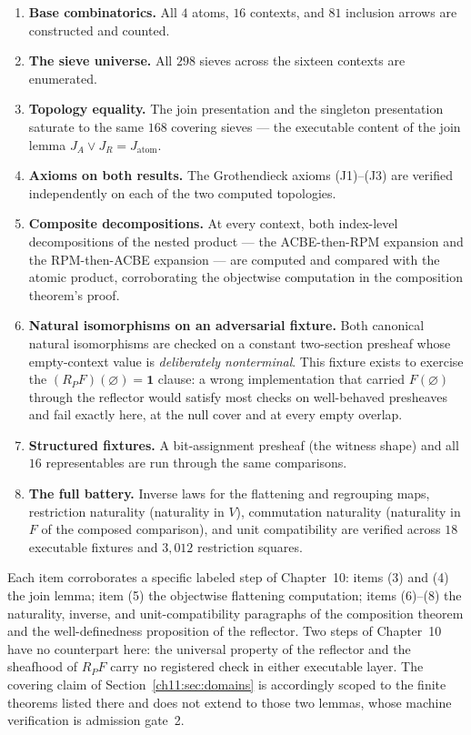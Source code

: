 \begin{enumerate}
\item \textbf{Base combinatorics.} All $4$ atoms, $16$ contexts, and $81$
inclusion arrows are constructed and counted.
\item \textbf{The sieve universe.} All $298$ sieves across the sixteen
contexts are enumerated.
\item \textbf{Topology equality.} The join presentation and the singleton
presentation saturate to the same $168$ covering sieves --- the executable
content of the join lemma $J_A \vee J_R = J_{\mathrm{atom}}$.
\item \textbf{Axioms on both results.} The Grothendieck axioms (J1)--(J3)
are verified independently on each of the two computed topologies.
\item \textbf{Composite decompositions.} At every context, both index-level
decompositions of the nested product --- the ACBE-then-RPM expansion and the
RPM-then-ACBE expansion --- are computed and compared with the atomic
product, corroborating the objectwise computation in the composition
theorem's proof.
\item \textbf{Natural isomorphisms on an adversarial fixture.} Both
canonical natural isomorphisms are checked on a constant two-section
presheaf whose empty-context value is \emph{deliberately nonterminal}. This
fixture exists to exercise the $(R_P F)(\varnothing) = \mathbf{1}$ clause:
a wrong implementation that carried $F(\varnothing)$ through the reflector
would satisfy most checks on well-behaved presheaves and fail exactly here,
at the null cover and at every empty overlap.
\item \textbf{Structured fixtures.} A bit-assignment presheaf (the witness
shape) and all $16$ representables are run through the same comparisons.
\item \textbf{The full battery.} Inverse laws for the flattening and
regrouping maps, restriction naturality (naturality in $V$), commutation
naturality (naturality in $F$ of the composed comparison), and unit
compatibility are verified across $18$ executable fixtures and $3{,}012$
restriction squares.
\end{enumerate}

Each item corroborates a specific labeled step of Chapter~10: items (3) and
(4) the join lemma; item (5) the objectwise flattening computation; items
(6)--(8) the naturality, inverse, and unit-compatibility paragraphs of the
composition theorem and the well-definedness proposition of the reflector.
Two steps of Chapter~10 have no counterpart here: the universal property of
the reflector and the sheafhood of $R_P F$ carry no registered check in
either executable layer. The covering claim of
Section~\ref{ch11:sec:domains} is accordingly scoped to the finite theorems
listed there and does not extend to those two lemmas, whose machine
verification is admission gate~2.

